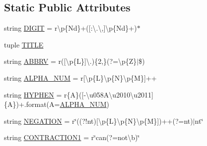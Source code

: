 \subsection*{Static Public Attributes}
\begin{DoxyCompactItemize}
\item 
string \hyperlink{classparlai_1_1agents_1_1tfidf__retriever_1_1tokenizers_1_1regexp__tokenizer_1_1RegexpTokenizer_a61b8759341e82c7907cebb9f50f52ae4}{D\+I\+G\+IT} = r\textquotesingle{}\textbackslash{}p\{Nd\}+(\mbox{[}\+:\textbackslash{}.\textbackslash{},\mbox{]}\textbackslash{}p\{Nd\}+)$\ast$\textquotesingle{}
\item 
tuple \hyperlink{classparlai_1_1agents_1_1tfidf__retriever_1_1tokenizers_1_1regexp__tokenizer_1_1RegexpTokenizer_aafcf344a127c586b424b9bc2a6a80196}{T\+I\+T\+LE}
\item 
string \hyperlink{classparlai_1_1agents_1_1tfidf__retriever_1_1tokenizers_1_1regexp__tokenizer_1_1RegexpTokenizer_a65cb61d1c0083a7ac246eb65740f44a0}{A\+B\+B\+RV} = r\textquotesingle{}(\mbox{[}\textbackslash{}p\{L\}\mbox{]}\textbackslash{}.)\{2,\}(?=\textbackslash{}p\{Z\}$\vert$\$)\textquotesingle{}
\item 
string \hyperlink{classparlai_1_1agents_1_1tfidf__retriever_1_1tokenizers_1_1regexp__tokenizer_1_1RegexpTokenizer_ad29494243ff7a47fa9c49f64b255b68f}{A\+L\+P\+H\+A\+\_\+\+N\+UM} = r\textquotesingle{}\mbox{[}\textbackslash{}p\{L\}\textbackslash{}p\{N\}\textbackslash{}p\{M\}\mbox{]}++\textquotesingle{}
\item 
string \hyperlink{classparlai_1_1agents_1_1tfidf__retriever_1_1tokenizers_1_1regexp__tokenizer_1_1RegexpTokenizer_a85d3430650e9cbce19f08d054d71bbe4}{H\+Y\+P\+H\+EN} = r\textquotesingle{}\{A\}(\mbox{[}-\/\textbackslash{}u058\+A\textbackslash{}u2010\textbackslash{}u2011\mbox{]}\{A\})+\textquotesingle{}.format(A=\hyperlink{classparlai_1_1agents_1_1tfidf__retriever_1_1tokenizers_1_1regexp__tokenizer_1_1RegexpTokenizer_ad29494243ff7a47fa9c49f64b255b68f}{A\+L\+P\+H\+A\+\_\+\+N\+UM})
\item 
string \hyperlink{classparlai_1_1agents_1_1tfidf__retriever_1_1tokenizers_1_1regexp__tokenizer_1_1RegexpTokenizer_a1a3e41cd10ab081a81de438bdea2cd38}{N\+E\+G\+A\+T\+I\+ON} = r\char`\"{}((?!n\textquotesingle{}t)\mbox{[}\textbackslash{}p\{L\}\textbackslash{}p\{N\}\textbackslash{}p\{M\}\mbox{]})++(?=n\textquotesingle{}t)$\vert$n\textquotesingle{}t\char`\"{}
\item 
string \hyperlink{classparlai_1_1agents_1_1tfidf__retriever_1_1tokenizers_1_1regexp__tokenizer_1_1RegexpTokenizer_abe3ce02620f3abd53bccaf69ba173c96}{C\+O\+N\+T\+R\+A\+C\+T\+I\+O\+N1} = r\char`\"{}can(?=not\textbackslash{}b)\char`\"{}

\end{DoxyCompactItemize}
